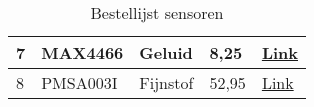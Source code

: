 \begin{table}[H]
\begin{tabular}{lllll}
\multicolumn{1}{|l|}{7}        & \multicolumn{1}{l|}{MAX4466}          & \multicolumn{1}{l|}{Geluid}              & \multicolumn{1}{l|}{8,25}                       & \multicolumn{1}{l|}{\href{https://nl.farnell.com/adafruit/1063/silicon-manufacturer-maxim-integrated/dp/2419156?st=MAX4466}{Link}}                    \\ \hline
\multicolumn{1}{|l|}{8}        & \multicolumn{1}{l|}{PMSA003I}         & \multicolumn{1}{l|}{Fijnstof}            & \multicolumn{1}{l|}{52,95}                      & \multicolumn{1}{l|}{\href{https://www.kiwi-electronics.com/nl/adafruit-pmsa003i-air-quality-breakout-stemma-qt-qwiic-10427?search=PMSA003I\%20}{Link}} \\ \hline
\end{tabular}
\caption{Bestellijst sensoren}
\label{tab:bestellijst}
\end{table}

